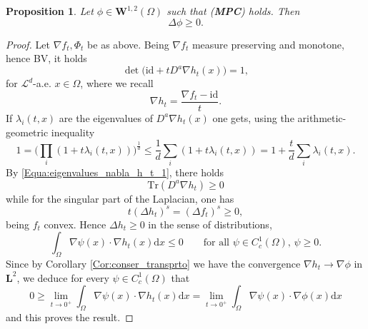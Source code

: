 \documentclass[10pt,a4paper]{amsart}
\newtheorem{proposition}{Proposition}
\newcommand{\Id}{\mathrm{id}}
\begin{document}
\begin{proposition}
\label{Prop:laplacian_1}
Let $\phi \in \mathbf W^{1,2}(\Omega)$ such that \emph{(\textbf{MPC})} holds. Then
$$
\Delta \phi \geq 0.
$$
\end{proposition}

\begin{proof}
Let $\nabla f_t, \Phi_t$ be as above.
Being $\nabla {f_t}$ measure preserving and monotone, hence BV, it holds
\begin{equation*}
\det \big( \Id + t D^a \nabla h_t(x) \big) = 1,
\end{equation*}
for $\mathscr L^d$-a.e. $x \in \Omega$, where we recall 
$$
\nabla h_t = \frac{\nabla f_t - \Id}{t}.
$$
If $\lambda_{i}(t,x)$ are the eigenvalues of $D^a \nabla h_t(x)$ one gets, using the arithmetic-geometric inequality
\begin{equation}
\label{Equa:eigenvalues_nabla_h_t_1}
1 = \bigg( \prod_i (1 + t \lambda_{i}(t,x)) \bigg)^{\frac{1}{d}} \leq \frac{1}{d} \sum_i (1 + t \lambda_{i}(t,x)) = 1 + \frac{t}{d} \sum_i \lambda_{i}(t,x).
\end{equation}
By \eqref{Equa:eigenvalues_nabla_h_t_1}, there holds
$$
\mathrm{Tr}(D^a \nabla h_t) \geq 0
$$
while for the singular part of the Laplacian, one has
\begin{equation*}
t (\Delta h_t)^s = (\Delta {f_t})^s \geq 0,
\end{equation*}
being $f_t$ convex. Hence $\Delta h_t \geq 0$ in the sense of distributions, 
$$
\int_{\Omega} \nabla \psi(x) \cdot \nabla h_t(x) \mathrm{d} x \leq 0 \qquad \text{for all $\psi \in C^1_c(\Omega)$, $\psi \geq 0$}.
$$
Since by Corollary \ref{Cor:conser_transprto} we have the convergence $\nabla h_t \to \nabla \phi$  in $\mathbf L^2$, we deduce for every $\psi \in C^1_c(\Omega)$ that 
$$
0 \geq \lim_{t \to 0^+} \int_{\Omega} \nabla \psi(x) \cdot \nabla h_t(x) \mathrm{d} x = \lim_{t \to 0^+} \int_{\Omega} \nabla \psi(x) \cdot \nabla \phi(x) \mathrm{d} x 
$$
and this proves the result.
\end{proof}
\end{document}

